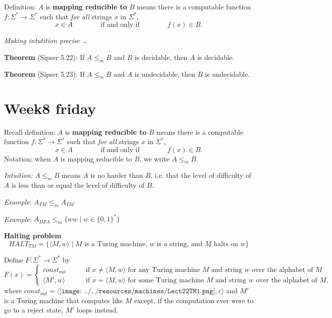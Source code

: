 \documentclass[12pt, oneside]{article}
\begin{document}
\newpage

Definition:  $A$ is  {\bf  mapping  reducible to} $B$  means there is a computable function 
$f : \Sigma^* \to \Sigma^*$ such that {\it for all} strings  $x$ in $\Sigma^*$, 
\[
x  \in  A \qquad \qquad \text{if and  only  if} \qquad \qquad f(x) \in B.
\]

{\it Making intutition precise \ldots}

{\bf Theorem} (Sipser 5.22): If $A \leq_m B$ and $B$ is decidable, then $A$ is decidable.
    
\vfill


{\bf Theorem} (Sipser 5.23): If $A \leq_m B$ and $A$ is undecidable, then $B$ is undecidable.
    
\vfill
 \vfill
\section*{Week8 friday}



Recall definition:  $A$ is  {\bf  mapping  reducible to} $B$  means there is a computable function 
$f : \Sigma^* \to \Sigma^*$ such that {\it for all} strings  $x$ in $\Sigma^*$, 
\[
x  \in  A \qquad \qquad \text{if and  only  if} \qquad \qquad f(x) \in B.
\]
Notation:  when $A$  is mapping reducible to $B$, we write $A  \leq_m B$.

{\it Intuition:} $A \leq_m B$ means $A$ is no harder than $B$, i.e. that the level 
of difficulty of $A$ is less than or equal the level of difficulty of $B$.


{\it Example}: $A_{TM} \leq_m A_{TM}$ 

\vfill

{\it Example}: $A_{DFA} \leq_m \{ ww \mid  w \in \{0,1\}^* \}$ 

\vfill






\newpage

    {\bf Halting problem}
    \[
    HALT_{TM} = \{ \langle M, w \rangle \mid \text{$M$ is a  Turing machine, $w$ is  a string, and $M$ halts on $w$} \}
    \]
    
    Define $F: \Sigma^* \to \Sigma^*$ by
    \[
    F(x) =  \begin{cases}
    const_{out} \qquad &\text{if  $x \neq \langle M,w \rangle$ for any Turing machine  $M$ and string  $w$ over the alphabet of $M$} \\
    \langle M', w \rangle \qquad &  \text{if $x = \langle M, w \rangle$ for some Turing machine  $M$ and string $w$ over the alphabet of $M$.}
    \end{cases}
    \]
    where $const_{out}  =  \langle  \texttt{[image: ../../resources/machines/Lect22TM1.png]} ,  \varepsilon  \rangle$
    and  $M'$ is a Turing machine that computes like $M$ except, if the computation ever were to go to a  reject state,
    $M'$ loops instead.   
\end{document}
